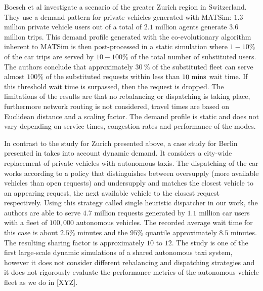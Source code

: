 Boesch et al \cite{boesch2016autonomous} investigate a scenario of the greater
Zurich region in Switzerland. They use a demand pattern for private vehicles
generated with MATSim: $1.3$ million  private vehicle users out of a total of
$2.1$ million agents generate $3.6$ million trips. This demand profile generated
with the co-evolutionary algorithm inherent to MATSim is then post-processed
in a static simulation where $1-10 \%$ of the car trips are served by $10-100 \%$
of the total number of substituted users. The authors conclude that approximately
$30 ~ \%$ of the substituted fleet can serve almost $100 \%$ of the substituted
requests within less than $10 ~ \textnormal{mins}$ wait time. If this threshold
wait time is surpassed, then the request is dropped. The limitations of the results
are that no rebalancing or dispatching is taking place, furthermore network routing
 is not considered, travel times are based on Euclidean distance and a scaling factor.
  The demand profile is static and does not vary depending on service times,
  congestion rates and performance of the modes.

In contrast to the study for Zurich presented above, a case study for Berlin
presented in \cite{bischoff2016simulation} takes into account dynamic demand.
It considers a city-wide replacement of private vehicles with autonomous taxis.
 The dispatching of the car works according to a policy that distinguishes
 between oversupply (more available vehicles than open requests) and undersupply
 and matches the closest vehicle to an appearing request, the next available
 vehicle to the closest request respectively. Using this strategy called single
 heuristic dispatcher in our work, the authors are able to serve $4.7$ million
 requests generated by $1.1$ million car users with a fleet of $100,000$ autonomous
 vehicles. The recorded average wait time for this case is about $2.5 \%$ minutes
 and the $95\%$ quantile approximately $8.5$ minutes. The resulting sharing factor
 is approximately $10$ to $12$. The study is one of the first large-scale dynamic
 simulations of a shared autonomous taxi system, however it does not consider
 different rebalancing and dispatching strategies and it does not rigorously
 evaluate the performance metrics of the autonomous vehicle fleet as we do in [XYZ].





